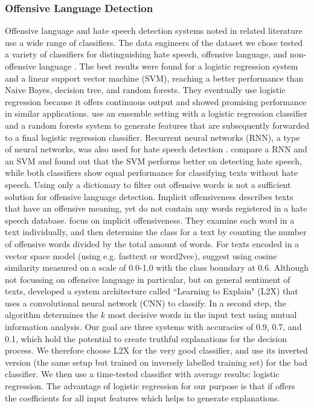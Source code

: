 \subsubsection{Offensive Language Detection}
\label{subsubsec:method_classifier}
Offensive language and hate speech detection systems noted in related literature use a wide range of classifiers.\newline
The data engineers of the dataset we chose tested a variety of classifiers for distinguishing hate speech, offensive language, and non-offensive language \cite{davidson2017automated}. The best results were found for a logistic regression system and a linear support vector machine (SVM), reaching a better performance than Naive Bayes, decision tree, and random forests. They eventually use logistic regression because it offers continuous output and showed promising performance in similar applications. \cite{montani2018tuwienkbs} use an ensemble setting with a logistic regression classifier and a random forests system to generate features that are subsequently forwarded to a final logistic regression classifier. Recurrent neural networks (RNN), a type of neural networks, was also used for hate speech detection \cite{del2017hate, rother2018ulmfit}. \cite{del2017hate} compare a RNN and an SVM and found out that the SVM performs better on detecting hate speech, while both classifiers show equal performance for classifying texts without hate speech. Using only a dictionary to filter out offensive words is not a sufficient solution for offensive language detection. Implicit offensiveness describes texts that have an offensive meaning, yet do not contain any words registered in a hate speech database. \cite{klenner2018offensive} focus on implicit offensiveness. They examine each word in a text individually, and then determine the class for a text by counting the number of offensive words divided by the total amount of words. For texts encoded in a vector space model (using e.g. fasttext or word2vec), \cite{gupta2018proposed} suggest using cosine similarity measured on a scale of 0.0-1.0 with the class boundary at 0.6. Although not focussing on offensive language in particular, but on general sentiment of texts, \cite{chen2018learning} developed a system architecture called ``Learning to Explain" (L2X) that uses a convolutional neural network (CNN) to classify. In a second step, the algorithm determines the $k$ most decisive words in the input text using mutual information analysis. \medskip \newline
Our goal are three systems with accuracies of 0.9, 0.7, and 0.1, which hold the potential to create truthful explanations for the decision process. We therefore choose L2X for the very good classifier, and use its inverted version (the same setup but trained on inversely labelled training set) for the bad classifier. We then use a time-tested classifier with average results: logistic regression. The advantage of logistic regression for our purpose is that if offers the coefficients for all input features which helps to generate explanations. 

